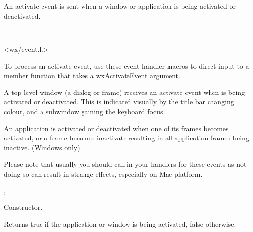 \section{}\label{wxactivateevent}

An activate event is sent when a window or application is being activated
or deactivated.


\\


<wx/event.h>


To process an activate event, use these event handler macros to direct input to a member
function that takes a wxActivateEvent argument.

\twocolwidtha{7cm}
\begin{twocollist}\itemsep=0pt
\end{twocollist}%


A top-level window (a dialog or frame) receives an activate event when is
being activated or deactivated. This is indicated visually by the title
bar changing colour, and a subwindow gaining the keyboard focus.

An application is activated or deactivated when one of its frames becomes activated,
or a frame becomes inactivate resulting in all application frames being inactive. (Windows only)

Please note that usually you should call  in
your handlers for these events as not doing so can result in strange effects,
especially on Mac platform.


,\rtfsp
{}


\label{wxactivateeventctor}


Constructor.

\label{wxactivateeventgetactive}


Returns true if the application or window is being activated, false otherwise.

